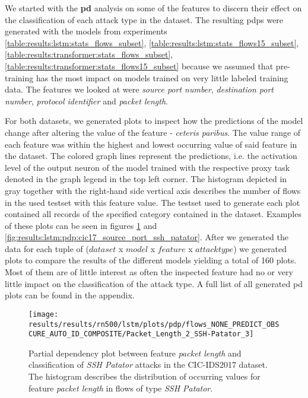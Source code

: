 We started with the \textbf{\gls{pd}} analysis on some of the features
to discern their effect on the classification of each attack type in the dataset. 
The resulting \glspl{pdp} were generated with the models from experiments \ref{table:results:lstm:stats_flows_subset},
\ref{table:results:lstm:stats_flows15_subset}, \ref{table:results:transformer:stats_flows_subset}, \ref{table:results:transformer:stats_flows15_subset} because we assumed that pre-training has the most impact on models trained on very little labeled training data. The features we looked at were \textit{source port number}, \textit{destination port number}, \textit{protocol identifier} and \textit{packet length}. \par
For both datasets, we generated plots to inspect how the predictions of the model change after altering the value of the feature - \textit{ceteris paribus}. The value range of each feature was within the highest and lowest occurring value of said feature in the dataset. The colored graph lines represent the predictions, i.e. the activation level of the output neuron of the model trained with the respective proxy task denoted in the graph legend in the top left corner. The histogram depicted in gray together with the right-hand side vertical axis describes the number of flows in the used testset with this feature value. 
The testset used to generate each plot contained all records of the specified category contained in the dataset. Examples of these plots can be seen in figures \ref{fig:results:lstm:pdp:cic17_packet_length_ssh_patator} and \ref{fig:results:lstm:pdp:cic17_source_port_ssh_patator}. After we generated the data for each tuple of ($dataset$ x $model$ x $feature$ x $attack type$) we generated plots to compare the results of the different models yielding a total of 160 plots. Most of them are of little interest as often the inspected feature had no or very little impact on the classification of the attack type. A full list of all generated \gls{pd} plots can be found in the appendix. \par 

\begin{figure}[h]
	\centering
	\texttt{[image: results/results/rn500/lstm/plots/pdp/flows\_NONE\_PREDICT\_OBSCURE\_AUTO\_ID\_COMPOSITE/Packet\_Length\_2\_SSH-Patator\_3]}
	\caption{Partial dependency plot between feature \textit{packet length} and classification of \textit{SSH Patator} attacks in the CIC-IDS2017 dataset. The histogram describes the distribution of occurring values for feature \textit{packet length} in flows of type \textit{SSH Patator}.}
	\label{fig:results:lstm:pdp:cic17_packet_length_ssh_patator}
\end{figure}

